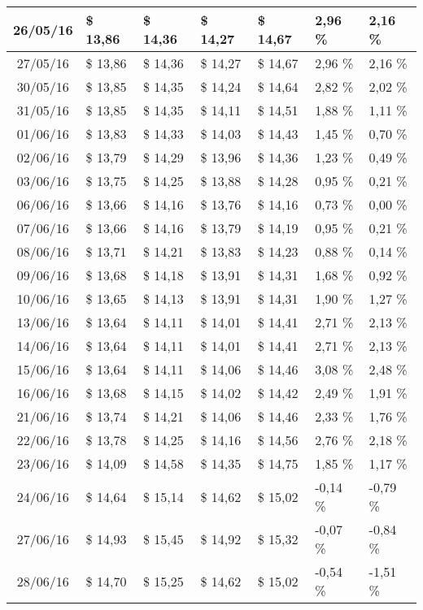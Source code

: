 \begin{center}
\begin{longtable}{|c|p{1.5cm}|p{1.5cm}|p{1.5cm}|p{1.5cm}|p{1.5cm}|p{1.5cm}|}
26/05/16 & \$ 13,86 & \$ 14,36 & \$ 14,27 & \$ 14,67 & 2,96 \% & 2,16 \% \\ \hline
27/05/16 & \$ 13,86 & \$ 14,36 & \$ 14,27 & \$ 14,67 & 2,96 \% & 2,16 \% \\ \hline
30/05/16 & \$ 13,85 & \$ 14,35 & \$ 14,24 & \$ 14,64 & 2,82 \% & 2,02 \% \\ \hline
31/05/16 & \$ 13,85 & \$ 14,35 & \$ 14,11 & \$ 14,51 & 1,88 \% & 1,11 \% \\ \hline
01/06/16 & \$ 13,83 & \$ 14,33 & \$ 14,03 & \$ 14,43 & 1,45 \% & 0,70 \% \\ \hline
02/06/16 & \$ 13,79 & \$ 14,29 & \$ 13,96 & \$ 14,36 & 1,23 \% & 0,49 \% \\ \hline
03/06/16 & \$ 13,75 & \$ 14,25 & \$ 13,88 & \$ 14,28 & 0,95 \% & 0,21 \% \\ \hline
06/06/16 & \$ 13,66 & \$ 14,16 & \$ 13,76 & \$ 14,16 & 0,73 \% & 0,00 \% \\ \hline
07/06/16 & \$ 13,66 & \$ 14,16 & \$ 13,79 & \$ 14,19 & 0,95 \% & 0,21 \% \\ \hline
08/06/16 & \$ 13,71 & \$ 14,21 & \$ 13,83 & \$ 14,23 & 0,88 \% & 0,14 \% \\ \hline
09/06/16 & \$ 13,68 & \$ 14,18 & \$ 13,91 & \$ 14,31 & 1,68 \% & 0,92 \% \\ \hline
10/06/16 & \$ 13,65 & \$ 14,13 & \$ 13,91 & \$ 14,31 & 1,90 \% & 1,27 \% \\ \hline
13/06/16 & \$ 13,64 & \$ 14,11 & \$ 14,01 & \$ 14,41 & 2,71 \% & 2,13 \% \\ \hline
14/06/16 & \$ 13,64 & \$ 14,11 & \$ 14,01 & \$ 14,41 & 2,71 \% & 2,13 \% \\ \hline
15/06/16 & \$ 13,64 & \$ 14,11 & \$ 14,06 & \$ 14,46 & 3,08 \% & 2,48 \% \\ \hline
16/06/16 & \$ 13,68 & \$ 14,15 & \$ 14,02 & \$ 14,42 & 2,49 \% & 1,91 \% \\ \hline
21/06/16 & \$ 13,74 & \$ 14,21 & \$ 14,06 & \$ 14,46 & 2,33 \% & 1,76 \% \\ \hline
22/06/16 & \$ 13,78 & \$ 14,25 & \$ 14,16 & \$ 14,56 & 2,76 \% & 2,18 \% \\ \hline
23/06/16 & \$ 14,09 & \$ 14,58 & \$ 14,35 & \$ 14,75 & 1,85 \% & 1,17 \% \\ \hline
24/06/16 & \$ 14,64 & \$ 15,14 & \$ 14,62 & \$ 15,02 & -0,14 \% & -0,79 \% \\ \hline
27/06/16 & \$ 14,93 & \$ 15,45 & \$ 14,92 & \$ 15,32 & -0,07 \% & -0,84 \% \\ \hline
28/06/16 & \$ 14,70 & \$ 15,25 & \$ 14,62 & \$ 15,02 & -0,54 \% & -1,51 \% \\ \hline

\end{longtable}
\end{center}
